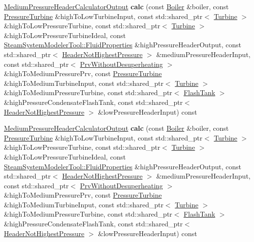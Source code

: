 \begin{DoxyCompactItemize}
\hyperlink{class_medium_pressure_header_calculator_output}{Medium\+Pressure\+Header\+Calculator\+Output} {\bfseries calc} (const \hyperlink{class_boiler}{Boiler} \&boiler, const \hyperlink{class_pressure_turbine}{Pressure\+Turbine} \&high\+To\+Low\+Turbine\+Input, const std\+::shared\+\_\+ptr$<$ \hyperlink{class_turbine}{Turbine} $>$ \&high\+To\+Low\+Pressure\+Turbine, const std\+::shared\+\_\+ptr$<$ \hyperlink{class_turbine}{Turbine} $>$ \&high\+To\+Low\+Pressure\+Turbine\+Ideal, const \hyperlink{struct_steam_system_modeler_tool_1_1_fluid_properties}{Steam\+System\+Modeler\+Tool\+::\+Fluid\+Properties} \&high\+Pressure\+Header\+Output, const std\+::shared\+\_\+ptr$<$ \hyperlink{class_header_not_highest_pressure}{Header\+Not\+Highest\+Pressure} $>$ \&medium\+Pressure\+Header\+Input, const std\+::shared\+\_\+ptr$<$ \hyperlink{class_prv_without_desuperheating}{Prv\+Without\+Desuperheating} $>$ \&high\+To\+Medium\+Pressure\+Prv, const \hyperlink{class_pressure_turbine}{Pressure\+Turbine} \&high\+To\+Medium\+Turbine\+Input, const std\+::shared\+\_\+ptr$<$ \hyperlink{class_turbine}{Turbine} $>$ \&high\+To\+Medium\+Pressure\+Turbine, const std\+::shared\+\_\+ptr$<$ \hyperlink{class_flash_tank}{Flash\+Tank} $>$ \&high\+Pressure\+Condensate\+Flash\+Tank, const std\+::shared\+\_\+ptr$<$ \hyperlink{class_header_not_highest_pressure}{Header\+Not\+Highest\+Pressure} $>$ \&low\+Pressure\+Header\+Input) const
\item 
\mbox{\label{class_medium_pressure_header_calculator_aafac27b1848d997cfd25790e40ad0f29}} 
\hyperlink{class_medium_pressure_header_calculator_output}{Medium\+Pressure\+Header\+Calculator\+Output} {\bfseries calc} (const \hyperlink{class_boiler}{Boiler} \&boiler, const \hyperlink{class_pressure_turbine}{Pressure\+Turbine} \&high\+To\+Low\+Turbine\+Input, const std\+::shared\+\_\+ptr$<$ \hyperlink{class_turbine}{Turbine} $>$ \&high\+To\+Low\+Pressure\+Turbine, const std\+::shared\+\_\+ptr$<$ \hyperlink{class_turbine}{Turbine} $>$ \&high\+To\+Low\+Pressure\+Turbine\+Ideal, const \hyperlink{struct_steam_system_modeler_tool_1_1_fluid_properties}{Steam\+System\+Modeler\+Tool\+::\+Fluid\+Properties} \&high\+Pressure\+Header\+Output, const std\+::shared\+\_\+ptr$<$ \hyperlink{class_header_not_highest_pressure}{Header\+Not\+Highest\+Pressure} $>$ \&medium\+Pressure\+Header\+Input, const std\+::shared\+\_\+ptr$<$ \hyperlink{class_prv_without_desuperheating}{Prv\+Without\+Desuperheating} $>$ \&high\+To\+Medium\+Pressure\+Prv, const \hyperlink{class_pressure_turbine}{Pressure\+Turbine} \&high\+To\+Medium\+Turbine\+Input, const std\+::shared\+\_\+ptr$<$ \hyperlink{class_turbine}{Turbine} $>$ \&high\+To\+Medium\+Pressure\+Turbine, const std\+::shared\+\_\+ptr$<$ \hyperlink{class_flash_tank}{Flash\+Tank} $>$ \&high\+Pressure\+Condensate\+Flash\+Tank, const std\+::shared\+\_\+ptr$<$ \hyperlink{class_header_not_highest_pressure}{Header\+Not\+Highest\+Pressure} $>$ \&low\+Pressure\+Header\+Input) const
\end{DoxyCompactItemize}


